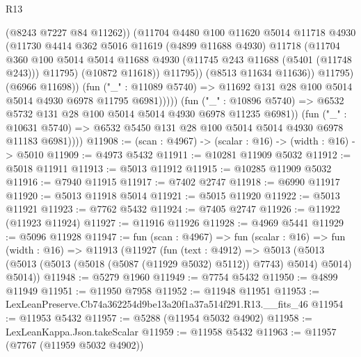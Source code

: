 \begin{lexlean}{R13}
\begin{coremodule}
                              (@8243 @7227 @84 @11262))
                            (@11704
                              @4480
                              @100
                              @11620
                              @5014
                              @11718
                              @4930
                              (@11730
                                @4414
                                @362
                                @5016
                                @11619
                                (@4899 @11688 @4930)
                                @11718
                                (@11704
                                  @360
                                  @100
                                  @5014
                                  @5014
                                  @11688
                                  @4930
                                  (@11745 @243 @11688 (@5401 (@11748 @243)))
                                  @11795)
                                (@10872 @11618))
                              @11795))
                          (@8513 @11634 @11636))
                        @11795)
                      (@6966 @11698))
                    (fun ("_" : @11089 @5740) =>
                    @11692 @131 @28 @100 @5014 @5014 @4930 @6978 @11795 @6981)))))
            (fun ("_" : @10896 @5740) =>
            @6532 @5732 @131 @28 @100 @5014 @5014 @4930 @6978 @11235 @6981))
          (fun ("_" : @10631 @5740) =>
          @6532 @5450 @131 @28 @100 @5014 @5014 @4930 @6978 @11183 @6981))))
@11908 := (scan : @4967) -> (scalar : @16) -> (width : @16) -> @5010
@11909 := @4973 @5432
@11911 := @10281 @11909 @5032
@11912 := @5018 @11911
@11913 := @5013 @11912
@11915 := @10285 @11909 @5032
@11916 := @7940 @11915
@11917 := @7402 @2747
@11918 := @6990 @11917
@11920 := @5013 @11918 @5014
@11921 := @5015 @11920
@11922 := @5013 @11921
@11923 := @7762 @5432
@11924 := @7405 @2747
@11926 := @11922 (@11923 @11924)
@11927 := @11916 @11926
@11928 := @4969 @5441
@11929 := @5096 @11928
@11947 := fun (scan : @4967) =>
  fun (scalar : @16) =>
  fun (width : @16) =>
  @11913
    (@11927
      (fun (text : @4912) =>
      @5013 (@5013 (@5013 (@5013 (@5018 (@5087 (@11929 @5032) @5112)) @7743) @5014) @5014) @5014))
@11948 := @5279 @1960
@11949 := @7754 @5432
@11950 := @4899 @11949
@11951 := @11950 @7958
@11952 := @11948 @11951
@11953 := LexLeanPreserve.Cb74a362254d9be13a20f1a37a514f291.R13.__fits_46
@11954 := @11953 @5432
@11957 := @5288 (@11954 @5032 @4902)
@11958 := LexLeanKappa.Json.takeScalar
@11959 := @11958 @5432
@11963 := @11957 (@7767 (@11959 @5032 @4902))

\end{coremodule}
\end{lexlean}
